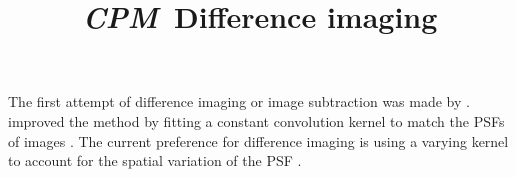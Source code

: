 \documentclass[12pt, preprint]{aastex}
\newcommand{\project}[1]{\textsl{#1}}
\newcommand{\cpm}{\project{CPM}}
\begin{document}
\title{\cpm\ Difference imaging}
\author{}

\section{}
The first attempt of difference imaging or image subtraction was made by \cite{imagesub1}.
\cite{alard} improved the method by fitting a constant convolution kernel to match the PSFs of images .
The current preference for difference imaging is using a varying kernel to account for the spatial variation of the PSF \citep{varyingkernel}. 


\clearpage

\clearpage
\end{document}
